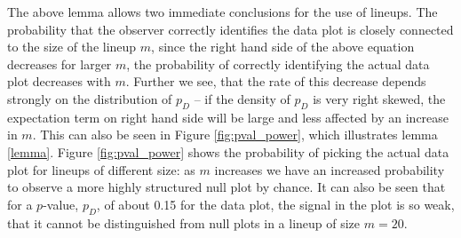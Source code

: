 \documentclass[12pt]{article}
\begin{document}
The above lemma allows two immediate conclusions for the use of lineups.
The probability that the observer correctly identifies the data plot is closely connected to the size of the lineup $m$, since the right hand side of the above equation decreases for larger $m$, the probability of correctly identifying the actual data plot decreases with $m$. %
Further we see, that the rate of this decrease depends strongly on the distribution of $p_D$ -- if the density of $p_D$ is very right skewed, the  expectation term on right hand side will be large and less affected by an increase in $m$. This can also be seen in Figure \ref{fig:pval_power}, which illustrates lemma \ref{lemma}.   Figure \ref{fig:pval_power} shows the probability of picking the actual data plot for lineups of different size: as $m$ increases we have an increased probability to observe a more highly structured null plot by chance. It can also be seen that for a $p$-value, $p_D$, of about 0.15 for the data plot, the signal in the plot is so weak, that it cannot be distinguished from null plots in a lineup of size $m=20$. %



\end{document}
